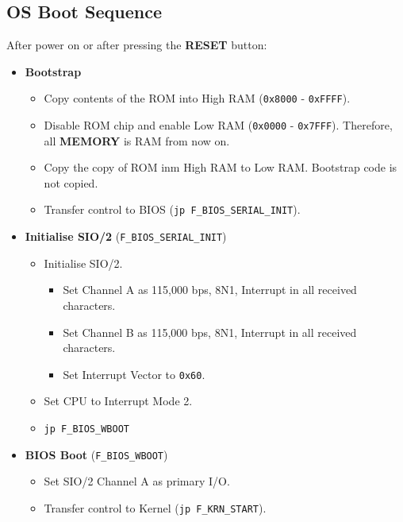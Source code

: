     \subsection{OS Boot Sequence}
    After power on or after pressing the \textbf{RESET} button:

    \begin{itemize}
        \item \textbf{Bootstrap}
        \begin{itemize}
            \item Copy contents of the ROM into High RAM (\texttt{0x8000} - \texttt{0xFFFF}).
            \item Disable ROM chip and enable Low RAM (\texttt{0x0000} - \texttt{0x7FFF}).
            Therefore, all \textbf{MEMORY} is RAM from now on.
            \item Copy the copy of ROM inm High RAM to Low RAM. Bootstrap code is not copied.
            \item Transfer control to BIOS (\texttt{jp F\_BIOS\_SERIAL\_INIT}).
        \end{itemize}
        \item \textbf{Initialise SIO/2} (\texttt{F\_BIOS\_SERIAL\_INIT})
        \begin{itemize}
            \item Initialise SIO/2.
            \begin{itemize}
                \item Set Channel A as 115,000 bps, 8N1, Interrupt in all 
                received characters.
                \item Set Channel B as 115,000 bps, 8N1, Interrupt in all 
                received characters.
                \item Set Interrupt Vector to \texttt{0x60}.
            \end{itemize}
            \item Set CPU to Interrupt Mode 2.
            \item \texttt{jp F\_BIOS\_WBOOT}
        \end{itemize}
        \item \textbf{BIOS Boot} (\texttt{F\_BIOS\_WBOOT})
        \begin{itemize}
            \item Set SIO/2 Channel A as primary I/O.
            \item Transfer control to Kernel (\texttt{jp F\_KRN\_START}).

\end{itemize}
\end{itemize}
